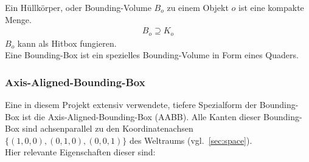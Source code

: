 \label{sec:bounding_volume}

Ein Hüllkörper, oder Bounding-Volume $B_o$ zu einem Objekt $o$ ist eine kompakte Menge.
\begin{align}
B_o \supseteq K_o
\end{align}
$B_o$ kann als Hitbox fungieren.\\
Eine Bounding-Box ist ein spezielles Bounding-Volume in Form eines Quaders.\\
\subsubsection{Axis-Aligned-Bounding-Box}
\label{sec:aabb}
\label{sec:AABB}
Eine in diesem Projekt extensiv verwendete, tiefere Spezialform der Bounding-Box ist die Axis-Aligned-Bounding-Box (AABB). Alle Kanten dieser Bounding-Box sind achsenparallel zu den Koordinatenachsen $\{(1,0,0), (0,1,0), (0,0,1)\}$ des Weltraums (vgl.~\ref{sec:space}).\\
Hier relevante Eigenschaften dieser sind:
